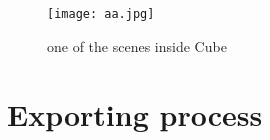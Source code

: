 \begin{figure}[h]
	\begin{center}
		\texttt{[image: aa.jpg]}
		\caption{one of the scenes inside Cube}
	\end{center}
\end{figure}

\section{Exporting process} %

\begin{comment}
\begin{code}
\documentclass[\meta{\dots\unkern}]{scrreprt} %

\usepackage[\meta{\dots\unkern}]{classicthesis}
\usepackage{arsclassica}


\dots

\end{code}

For example, this document has been produced with the following code:
\begin{code}
\documentclass[a4paper,twoside,openright,titlepage,
               headinclude,footinclude,BCOR5mm,
               numbers=noenddot,cleardoublepage=empty,
               tablecaptionabove]{scrreprt}

\usepackage{\meta{\dots\unkern}}
\usepackage{subfig}
\usepackage[eulerchapternumbers,subfig,beramono,eulermath,pdfspacing]%
           {classicthesis}
\usepackage{arsclassica}


\dots

\end{code}

It is recommended to use the \optname{beramono} and \optname{eulerchapternumbers} options together with \arsclassica.



\section{Style}

The typographical style achieved with \arsclassica{} differs from \classicthesis{} in the following points:
\begin{itemize}
\item use of Iwona font, by Janusz Nowacki, for the sectioning unit titles (chapters, sections, subsections, sub-subsections, paragraphs and subparagraphs), for the description list labels, the headlines and the caption labels (\classicthesis{} doesn't use any sans serif font);
\item customized chapter numbers;
\item semi-transparent headlines; the headlines are separated from the page number by a small rule;
\item caption labels in boldface (\classicthesis{} doesn't use any boldface font);
\item itemize lists with semi-transparent bullets.
\end{itemize}


\end{comment}
